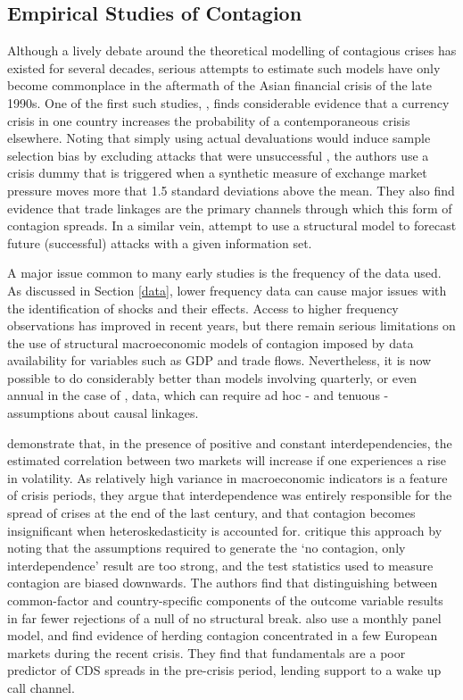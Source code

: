 \documentclass[../base.tex]{subfiles}
\begin{document}
\subsection{Empirical Studies of Contagion}

Although a lively debate around the theoretical modelling of contagious crises has existed for several decades, serious attempts to estimate such models have only become commonplace in the aftermath of the Asian financial crisis of the late 1990s. One of the first such studies, \cite{eichengreen1996contagious}, finds considerable evidence that a currency crisis in one country increases the probability of a contemporaneous crisis elsewhere. Noting that simply using actual devaluations would induce sample selection bias by excluding attacks that were unsuccessful , the authors use a crisis dummy that is triggered when a synthetic measure of exchange market pressure moves more that 1.5 standard deviations above the mean. They also find evidence that trade linkages are the primary channels through which this form of contagion spreads. In a similar vein, \cite{esquivel1998explaining} attempt to use a structural model to forecast future (successful) attacks with a given information set.

A major issue common to many early studies is the frequency of the data used. As discussed in Section \ref{data}, lower frequency data can cause major issues with the identification of shocks and their effects. Access to higher frequency observations has improved in recent years, but there remain serious limitations on the use of structural macroeconomic models of contagion imposed by data availability for variables such as GDP and trade flows. Nevertheless, it is now possible to do considerably better than models involving quarterly, or even annual in the case of \cite{esquivel1998explaining}, data, which can require ad hoc - and tenuous - assumptions about causal linkages.

\cite{forbes2002no} demonstrate that, in the presence of positive and constant interdependencies, the estimated correlation between two markets will increase if one experiences a rise in volatility. As relatively high variance in macroeconomic indicators is a feature of crisis periods, they argue that interdependence was entirely responsible for the spread of crises at the end of the last century, and that contagion becomes insignificant when heteroskedasticity is accounted for. \cite{corsetti2005some} critique this approach by noting that the assumptions required to generate the `no contagion, only interdependence' result are too strong, and the test statistics used to measure contagion are biased downwards. The authors find that distinguishing between common-factor and country-specific components of the outcome variable results in far fewer rejections of a null of no structural break. \cite{beirne2013pricing} also use a monthly panel model, and find evidence of herding contagion concentrated in a few European markets during the recent crisis. They find that fundamentals are a poor predictor of CDS spreads in the pre-crisis period, lending support to a wake up call channel.
\end{document}
